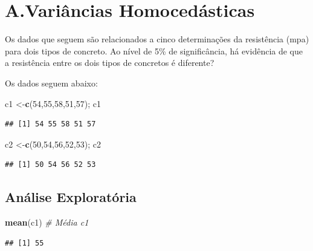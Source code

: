 \documentclass[
]{book}
\newenvironment{Shaded}{\begin{snugshade}}{\end{snugshade}}
\newcommand{\CommentTok}[1]{\textcolor[rgb]{0.56,0.35,0.01}{\textit{#1}}}
\newcommand{\DecValTok}[1]{\textcolor[rgb]{0.00,0.00,0.81}{#1}}
\newcommand{\FunctionTok}[1]{\textcolor[rgb]{0.13,0.29,0.53}{\textbf{#1}}}
\newcommand{\NormalTok}[1]{#1}
\newcommand{\OtherTok}[1]{\textcolor[rgb]{0.56,0.35,0.01}{#1}}
\begin{document}
\section{A.Variâncias Homocedásticas}\label{a.variuxe2ncias-homoceduxe1sticas}

Os dados que seguem são relacionados a cinco determinações da resistência (mpa) para dois tipos de concreto.
Ao nível de 5\% de significância, há evidência de que a resistência entre os dois tipos de concretos é diferente?

Os dados seguem abaixo:

\begin{Shaded}
\begin{Highlighting}[]
\NormalTok{c1 }\OtherTok{\textless{}{-}}\FunctionTok{c}\NormalTok{(}\DecValTok{54}\NormalTok{,}\DecValTok{55}\NormalTok{,}\DecValTok{58}\NormalTok{,}\DecValTok{51}\NormalTok{,}\DecValTok{57}\NormalTok{); c1}
\end{Highlighting}
\end{Shaded}

\begin{verbatim}
## [1] 54 55 58 51 57
\end{verbatim}

\begin{Shaded}
\begin{Highlighting}[]
\NormalTok{c2 }\OtherTok{\textless{}{-}}\FunctionTok{c}\NormalTok{(}\DecValTok{50}\NormalTok{,}\DecValTok{54}\NormalTok{,}\DecValTok{56}\NormalTok{,}\DecValTok{52}\NormalTok{,}\DecValTok{53}\NormalTok{); c2}
\end{Highlighting}
\end{Shaded}

\begin{verbatim}
## [1] 50 54 56 52 53
\end{verbatim}

\subsection{Análise Exploratória}\label{anuxe1lise-exploratuxf3ria}

\begin{Shaded}
\begin{Highlighting}[]
\FunctionTok{mean}\NormalTok{(c1) }\CommentTok{\# Média c1}
\end{Highlighting}
\end{Shaded}

\begin{verbatim}
## [1] 55
\end{verbatim}
\end{document}
